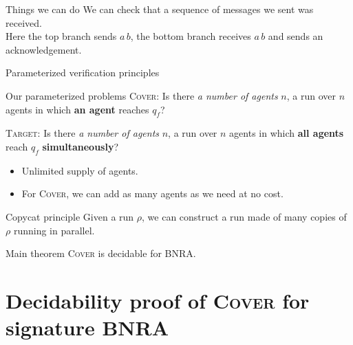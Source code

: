 \documentclass{beamer}
\newcommand{\COVER}{\textsc{Cover}\xspace}
\newcommand{\TARGET}{\textsc{Target}\xspace}
\begin{document}
\begin{frame}{Things we can do}
	We can check that a sequence of messages we sent was received. \\
	Here the top branch sends $a \, b$, the bottom branch receives $a \, b$ and sends an acknowledgement. 
	\vspace{0.5cm}

		\centering
		
\end{frame}

\begin{frame}{Parameterized verification principles}
	
	\begin{block}{Our parameterized problems}
		{\COVER}: Is there \emph{a number of agents} $n$, a run over $n$ agents in which \textbf{an agent} reaches $q_f$?
		
		{\TARGET}: Is there \emph{a number of agents} $n$, a run over $n$ agents in which \textbf{all agents} reach $q_f$ \textbf{simultaneously}?
	\end{block}
	
	\pause

	\begin{itemize}
		\item Unlimited supply of agents.
		
		\item For {\COVER}, we can add as many agents as we need at no cost. 
	\end{itemize}
	
	\pause
	
	\begin{block}{Copycat principle}
		Given a run $\rho$, we can construct a run made of many copies of $\rho$ running in parallel.
	\end{block}
	
	\pause 

	\begin{block}{Main theorem}
		{\COVER} is decidable for BNRA.
	\end{block}
	
\end{frame}







\section{Decidability proof of \COVER for signature BNRA}
\end{document}
